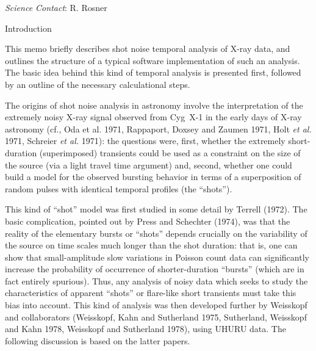 %
\def\version{\it Rev. 1.0 - 8/1/86}
\def\chapter{\it Timing Analysis: Shot Noise Analysis}

\vskip 12pt
\noindent
{\it Science Contact}:  R. Rosner

\@{Introduction}

This memo briefly describes shot noise temporal analysis of X-ray
data, and outlines the structure of a typical software implementation
of such an analysis.  The basic idea behind this kind of temporal
analysis is presented first, followed by an outline of the necessary
calculational steps.

The origins of shot noise analysis in astronomy involve the
interpretation of the extremely noisy X-ray signal observed from
Cyg~X-1 in the early days of X-ray astronomy (cf., Oda et al. 1971,
Rappaport, Doxsey and Zaumen 1971, Holt {\it et al.} 1971, Schreier
{\it et al.}
1971): the questions were, first, whether the extremely short-duration
(superimposed) transients could be used as a constraint on the size of
the source (via a light travel time argument) and, second, whether one
could build a model for the observed bursting behavior in terms of a
superposition of random pulses with identical temporal profiles (the
``shots'').

This kind of ``shot'' model was first studied in some detail by
Terrell (1972).  The basic complication, pointed out by Press and
Schechter (1974), was that the reality of the elementary bursts or
``shots'' depends crucially on the variability of the source on time
scales much longer than the shot duration:  that is, one can show that
small-amplitude slow variations in Poisson count data can
significantly increase the probability of occurrence of
shorter-duration ``bursts'' (which are in fact entirely spurious).
Thus, any analysis of noisy data which seeks to study the
characteristics of apparent ``shots'' or flare-like short transients
must take this bias into account.  This kind of analysis was then
developed further by Weisskopf and collaborators (Weisskopf, Kahn and
Sutherland 1975, Sutherland, Weisskopf and Kahn 1978, Weisskopf and
Sutherland 1978), using UHURU data.  The following discussion is based
on the latter papers.

